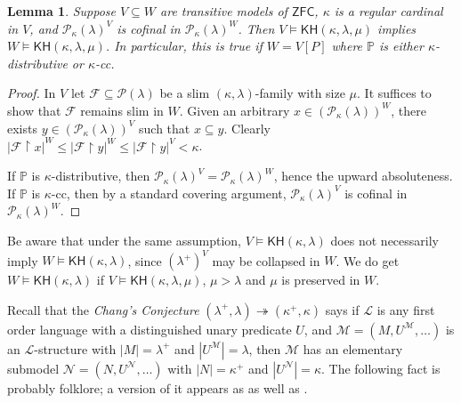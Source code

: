 \documentclass[10pt,reqno]{amsart}
\theoremstyle{plain}
\newtheorem{lemma}[theorem]{Lemma}
\theoremstyle{definition}
\theoremstyle{remark}
\begin{document}
\begin{lemma}\label{KH_upward}
Suppose $V\subseteq W$ are transitive models of $\mathsf{ZFC}$, $\kappa$ is a regular cardinal in $V$, and $\mathcal{P}_\kappa(\lambda)^V$ is cofinal in $\mathcal{P}_\kappa(\lambda)^W$. Then $V\models\mathsf{KH}(\kappa,\lambda,\mu)$ implies $W\models\mathsf{KH}(\kappa,\lambda,\mu)$. In particular, this is true if $W=V[P]$ where $\mathbb{P}$ is either $\kappa$-distributive or $\kappa$-cc.\end{lemma}
\begin{proof}
In $V$ let $\mathcal{F}\subseteq\mathcal{P}(\lambda)$ be a slim $(\kappa,\lambda)$-family with size $\mu$. It suffices to show that $\mathcal{F}$ remains slim in $W$. Given an arbitrary $x\in(\mathcal{P}_\kappa(\lambda))^W$, there exists $y\in(\mathcal{P}_\kappa(\lambda))^V$ such that $x\subseteq y$. Clearly $|\mathcal{F}\upharpoonright x|^W\leq|\mathcal{F}\upharpoonright y|^W\leq|\mathcal{F}\upharpoonright y|^V<\kappa$.

If $\mathbb{P}$ is $\kappa$-distributive, then $\mathcal{P}_\kappa(\lambda)^V=\mathcal{P}_\kappa(\lambda)^W$, hence the upward absoluteness. If $\mathbb{P}$ is $\kappa$-cc, then by a standard covering argument, $\mathcal{P}_\kappa(\lambda)^V$ is cofinal in $\mathcal{P}_\kappa(\lambda)^W$.
\end{proof}

Be aware that under the same assumption, $V\models\mathsf{KH}(\kappa,\lambda)$ does not necessarily imply $W\models\mathsf{KH}(\kappa,\lambda)$, since $(\lambda^+)^V$ may be collapsed in $W$. We do get $W\models\mathsf{KH}(\kappa,\lambda)$ if $V\models\mathsf{KH}(\kappa,\lambda,\mu)$, $\mu>\lambda$ and $\mu$ is preserved in $W$.




Recall that the \textit{Chang's Conjecture} $(\lambda^+,\lambda)\twoheadrightarrow(\kappa^+,\kappa)$ says if $\mathcal{L}$ is any first order language with a distinguished unary predicate $U$, and $\mathcal{M}=(M,U^\mathcal{M},\dots)$ is an $\mathcal{L}$-structure with $|M|=\lambda^+$ and $|U^\mathcal{M}|=\lambda$, then $\mathcal{M}$ has an elementary submodel $\mathcal{N}=(N,U^\mathcal{N},\dots)$ with $|N|=\kappa^+$ and $|U^\mathcal{N}|=\kappa$. The following fact is probably folklore; a version of it appears as \cite[Theorem 3.1]{golshani2019generalized} as well as \cite[Remark 7.6.39]{todorcevic2007walks}.
\end{document}
